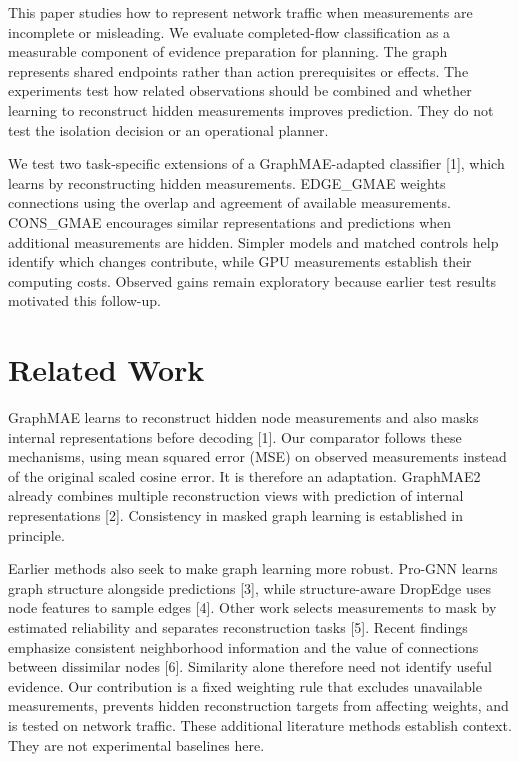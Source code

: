 \documentclass[11pt,letterpaper]{article}
\begin{document}
This paper studies how to represent network traffic when measurements are incomplete or misleading. We evaluate completed-flow classification as a measurable component of evidence preparation for planning. The graph represents shared endpoints rather than action prerequisites or effects. The experiments test how related observations should be combined and whether learning to reconstruct hidden measurements improves prediction. They do not test the isolation decision or an operational planner.\par

We test two task-specific extensions of a GraphMAE-adapted classifier [1], which learns by reconstructing hidden measurements. EDGE\_GMAE weights connections using the overlap and agreement of available measurements. CONS\_GMAE encourages similar representations and predictions when additional measurements are hidden. Simpler models and matched controls help identify which changes contribute, while GPU measurements establish their computing costs. Observed gains remain exploratory because earlier test results motivated this follow-up.\par

\section{Related Work}

GraphMAE learns to reconstruct hidden node measurements and also masks internal representations before decoding [1]. Our comparator follows these mechanisms, using mean squared error (MSE) on observed measurements instead of the original scaled cosine error. It is therefore an adaptation. GraphMAE2 already combines multiple reconstruction views with prediction of internal representations [2]. Consistency in masked graph learning is established in principle.\par

Earlier methods also seek to make graph learning more robust. Pro-GNN learns graph structure alongside predictions [3], while structure-aware DropEdge uses node features to sample edges [4]. Other work selects measurements to mask by estimated reliability and separates reconstruction tasks [5]. Recent findings emphasize consistent neighborhood information and the value of connections between dissimilar nodes [6]. Similarity alone therefore need not identify useful evidence. Our contribution is a fixed weighting rule that excludes unavailable measurements, prevents hidden reconstruction targets from affecting weights, and is tested on network traffic. These additional literature methods establish context. They are not experimental baselines here.\par
\end{document}
